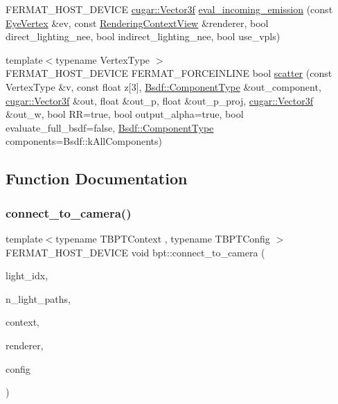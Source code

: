 \begin{DoxyCompactItemize}
\item 
F\+E\+R\+M\+A\+T\+\_\+\+H\+O\+S\+T\+\_\+\+D\+E\+V\+I\+CE \hyperlink{structcugar_1_1_vector}{cugar\+::\+Vector3f} \hyperlink{group___b_p_t_lib_core_ga73b14b0e545498e4ad796b4776c20836}{eval\+\_\+incoming\+\_\+emission} (const \hyperlink{struct_eye_vertex}{Eye\+Vertex} \&ev, const \hyperlink{struct_rendering_context_view}{Rendering\+Context\+View} \&renderer, bool direct\+\_\+lighting\+\_\+nee, bool indirect\+\_\+lighting\+\_\+nee, bool use\+\_\+vpls)
\item 
{\footnotesize template$<$typename Vertex\+Type $>$ }\\F\+E\+R\+M\+A\+T\+\_\+\+H\+O\+S\+T\+\_\+\+D\+E\+V\+I\+CE F\+E\+R\+M\+A\+T\+\_\+\+F\+O\+R\+C\+E\+I\+N\+L\+I\+NE bool \hyperlink{group___b_p_t_lib_core_ga161551b8c343e47e329703e71e0aaeca}{scatter} (const Vertex\+Type \&v, const float z\mbox{[}3\mbox{]}, \hyperlink{struct_bsdf_a5f7db6f81220ed9ee6da109d6eb5b585}{Bsdf\+::\+Component\+Type} \&out\+\_\+component, \hyperlink{structcugar_1_1_vector}{cugar\+::\+Vector3f} \&out, float \&out\+\_\+p, float \&out\+\_\+p\+\_\+proj, \hyperlink{structcugar_1_1_vector}{cugar\+::\+Vector3f} \&out\+\_\+w, bool RR=true, bool output\+\_\+alpha=true, bool evaluate\+\_\+full\+\_\+bsdf=false, \hyperlink{struct_bsdf_a5f7db6f81220ed9ee6da109d6eb5b585}{Bsdf\+::\+Component\+Type} components=Bsdf\+::k\+All\+Components)
\end{DoxyCompactItemize}


\subsection{Function Documentation}
\mbox{\label{group___b_p_t_lib_core_gaf85f457b11ee79f45371b8afe928cabe}} 
\subsubsection{\texorpdfstring{connect\+\_\+to\+\_\+camera()}{connect\_to\_camera()}}
{\footnotesize\ttfamily template$<$typename T\+B\+P\+T\+Context , typename T\+B\+P\+T\+Config $>$ \\
F\+E\+R\+M\+A\+T\+\_\+\+H\+O\+S\+T\+\_\+\+D\+E\+V\+I\+CE void bpt\+::connect\+\_\+to\+\_\+camera (\begin{DoxyParamCaption}\item[{const uint32}]{light\+\_\+idx,  }\item[{const uint32}]{n\+\_\+light\+\_\+paths,  }\item[{T\+B\+P\+T\+Context \&}]{context,  }\item[{\hyperlink{struct_rendering_context_view}{Rendering\+Context\+View} \&}]{renderer,  }\item[{const T\+B\+P\+T\+Config \&}]{config }\end{DoxyParamCaption})}

